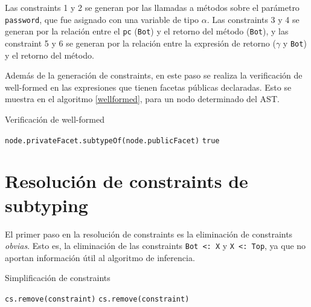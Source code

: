 Las constraints 1 y 2 se generan por las llamadas a métodos sobre el parámetro \texttt{password}, que fue asignado con una variable de tipo $\alpha$. Las constraints 3 y 4 se generan por la relación entre el \texttt{pc} (\texttt{Bot}) y el retorno del método (\texttt{Bot}), y las constraint 5 y 6 se generan por la relación entre la expresión de retorno ($\gamma$ y \texttt{Bot}) y el retorno del método.

Además de la generación de constraints, en este paso se realiza la verificación de well-formed en las expresiones que tienen facetas públicas declaradas. Esto se muestra en el algoritmo \ref{wellformed}, para un nodo determinado del AST.

\begin{algorithm}\captionsetup{labelsep=newline}
  \centering
  \caption{Verificación de well-formed}
  \label{wellformed}
    \begin{algorithmic}[1]
            \State \Return \texttt{node.privateFacet.subtypeOf(node.publicFacet)}
          \EndIf
          \State \Return \texttt{true}
      \EndFunction
    \end{algorithmic}
\end{algorithm}

\section{Resolución de constraints de subtyping} \label{propuestaRes}

El primer paso en la resolución de constraints es la eliminación de constraints \textit{obvias}. Esto es, la eliminación de las constraints \texttt{Bot <: X} y \texttt{X <: Top}, ya que no aportan información útil al algoritmo de inferencia.

\begin{algorithm}\captionsetup{labelsep=newline}
  \centering
  \caption{Simplificación de constraints}
  \label{pseudosimplify}
    \begin{algorithmic}[1]
              \State \texttt{cs.remove(constraint)}
              \State \texttt{cs.remove(constraint)}
            \EndIf
          \EndFor
      \EndFunction
    \end{algorithmic}
\end{algorithm}

